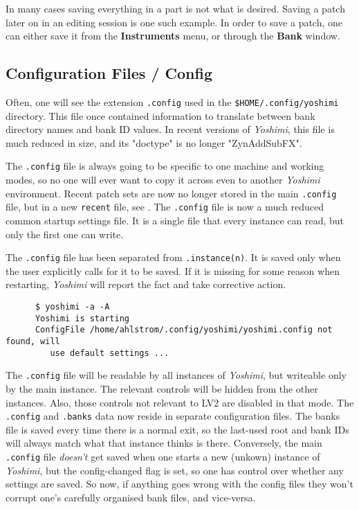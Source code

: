    In many cases saving everything in a part is not what is desired.
   Saving a patch later on in an editing session is one such example.
   In order to save a patch, one can either save it from the
   \textbf{Instruments} menu, or through the \textbf{Bank} window.

\subsection{Configuration Files / Config}
\label{subsec:configuration_config}

   Often, one will see the extension \texttt{.config} used in the
   \texttt{\$HOME/.config/yoshimi} directory.  This file once contained
   information to translate between bank directory names and bank ID
   values.  In recent versions of \textsl{Yoshimi}, this file is much
   reduced in size, and its "doctype" is no longer "ZynAddSubFX".

   The \texttt{.config} file is always going to be specific to one machine and
   working modes, so no one will ever want to copy it across even to another
   \textsl{Yoshimi} environment.  Recent patch sets are now no longer stored in
   the main \texttt{.config} file, but in a new \texttt{recent} file,
   see .
   The \texttt{.config} file is now a much reduced common startup settings
   file.  It is a single file that every instance can read, but only the
   first one can write.

   The \texttt{.config} file has been separated from \texttt{.instance(n)}.
   It is saved only when the user explicitly calls for it to be saved. If
   it is missing for some reason when restarting, \textsl{Yoshimi} will
   report the fact and take corrective action.

   \begin{verbatim}
      $ yoshimi -a -A
      Yoshimi is starting
      ConfigFile /home/ahlstrom/.config/yoshimi/yoshimi.config not found, will
         use default settings ...
   \end{verbatim}

   The \texttt{.config} file will be readable by all instances of
   \textsl{Yoshimi}, but writeable only by the main instance. The relevant
   controls will be hidden from the other instances.  Also, those controls not
   relevant to LV2 are disabled in that mode.  The \texttt{.config} and
   \texttt{.banks} data now reside in separate configuration files.  The banks
   file is saved every time there is a normal exit, so the last-used root and
   bank IDs will always match what that instance thinks is there.  Conversely,
   the main \texttt{.config} file \textsl{doesn't} get saved when one starts a
   new (unkown) instance of \textsl{Yoshimi}, but the config-changed flag is
   set, so one has control over whether any settings are saved.  So now, if
   anything goes wrong with the config files they won't corrupt one's carefully
   organised bank files, and vice-versa.

